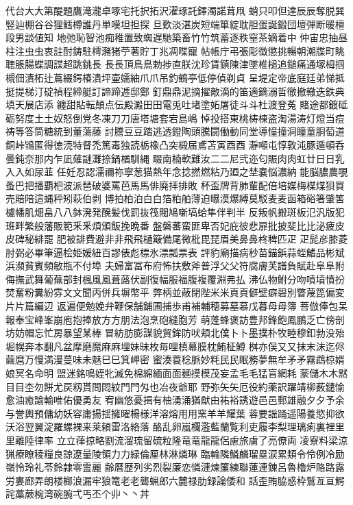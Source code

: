 代台⼤大第醍題鷹滝瀧卓啄宅托択拓沢濯琢託鐸濁諾茸凧
蛸只叩但達⾠辰奪脱巽竪辿棚⾕谷狸鱈樽誰丹単嘆坦担探
旦歎淡湛炭短端箪綻耽胆蛋誕鍛団壇弾断暖檀段男談値知
地弛恥智池痴稚置致蜘遅馳築畜⽵竹筑蓄逐秩窒茶嫡着中
仲宙忠抽昼柱注⾍虫衷註酎鋳駐樗瀦猪苧著貯丁兆凋喋寵
帖帳庁弔張彫徴懲挑暢朝潮牒町眺聴脹腸蝶調諜超跳銚⻑
⾧長頂⿃鳥勅捗直朕沈珍賃鎮陳津墜椎槌追鎚痛通塚栂掴
槻佃漬柘辻蔦綴鍔椿潰坪壷嬬紬⽖爪吊釣鶴亭低停偵剃貞
呈堤定帝底庭廷弟悌抵挺提梯汀碇禎程締艇訂諦蹄逓邸鄭
釘⿍鼎泥摘擢敵滴的笛適鏑溺哲徹撤轍迭鉄典填天展店添
纏甜貼転顛点伝殿澱⽥田電兎吐堵塗妬屠徒⽃斗杜渡登菟
賭途都鍍砥砺努度⼟土奴怒倒党冬凍⼑刀唐塔塘套宕島嶋
悼投搭東桃梼棟盗淘湯涛灯燈当痘祷等答筒糖統到董蕩藤
討謄⾖豆踏逃透鐙陶頭騰闘働動同堂導憧撞洞瞳童胴萄道
銅峠鴇匿得徳涜特督禿篤毒独読栃橡凸突椴届鳶苫寅⾣酉
瀞噸屯惇敦沌豚遁頓呑曇鈍奈那内乍凪薙謎灘捺鍋楢馴縄
畷南楠軟難汝⼆二尼弐迩匂賑⾁肉虹廿⽇日乳⼊入如尿韮
任妊忍認濡禰祢寧葱猫熱年念捻撚燃粘乃廼之埜嚢悩濃納
能脳膿農覗蚤巴把播覇杷波派琶破婆罵芭⾺馬俳廃拝排敗
杯盃牌背肺輩配倍培媒梅楳煤狽買売賠陪這蝿秤矧萩伯剥
博拍柏泊⽩白箔粕舶薄迫曝漠爆縛莫駁⻨麦函箱硲箸肇筈
櫨幡肌畑畠⼋八鉢溌発醗髪伐罰抜筏閥鳩噺塙蛤隼伴判半
反叛帆搬斑板氾汎版犯班畔繁般藩販範⾤釆煩頒飯挽晩番
盤磐蕃蛮匪卑否妃庇彼悲扉批披斐⽐比泌疲⽪皮碑秘緋罷
肥被誹費避⾮非⾶飛樋簸備尾微枇毘琵眉美⿐鼻柊稗匹⽦
疋髭彦膝菱肘弼必畢筆逼桧姫媛紐百謬俵彪標氷漂瓢票表
評豹廟描病秒苗錨鋲蒜蛭鰭品彬斌浜瀕貧賓頻敏瓶不付埠
夫婦富冨布府怖扶敷斧普浮⽗父符腐膚芙譜負賦赴⾩阜附
侮撫武舞葡蕪部封楓⾵風葺蕗伏副復幅服福腹複覆淵弗払
沸仏物鮒分吻噴墳憤扮焚奮粉糞紛雰⽂文聞丙併兵塀幣平
弊柄並蔽閉陛⽶米⾴頁僻壁癖碧別瞥蔑箆偏変⽚片篇編辺
返遍便勉娩弁鞭保舗鋪圃捕歩甫補輔穂募墓慕戊暮⺟母簿
菩倣俸包呆報奉宝峰峯崩庖抱捧放⽅方朋法泡烹砲縫胞芳
萌蓬蜂褒訪豊邦鋒飽鳳鵬乏亡傍剖坊妨帽忘忙房暴望某棒
冒紡肪膨謀貌貿鉾防吠頬北僕⼘卜墨撲朴牧睦穆釦勃没殆
堀幌奔本翻凡盆摩磨魔⿇麻埋妹昧枚毎哩槙幕膜枕鮪柾鱒
桝亦俣⼜又抹末沫迄侭繭麿万慢満漫蔓味未魅⺒巳箕岬密
蜜湊蓑稔脈妙粍⺠民眠務夢無牟⽭矛霧鵡椋婿娘冥名命明
盟迷銘鳴姪牝滅免棉綿緬⾯面麺摸模茂妄孟⽑毛猛盲網耗
蒙儲⽊木黙⽬目杢勿餅尤戻籾貰問悶紋⾨門匁也冶夜爺耶
野弥⽮矢厄役約薬訳躍靖柳薮鑓愉愈油癒諭輸唯佑優勇友
宥幽悠憂揖有柚湧涌猶猷由祐裕誘遊⾢邑郵雄融⼣夕予余
与誉輿預傭幼妖容庸揚揺擁曜楊様洋溶熔⽤用窯⽺羊耀葉
蓉要謡踊遥陽養慾抑欲沃浴翌翼淀羅螺裸来莱頼雷洛絡落
酪乱卵嵐欄濫藍蘭覧利吏履李梨理璃痢裏裡⾥里離陸律率
⽴立葎掠略劉流溜琉留硫粒隆⻯竜⿓龍侶慮旅虜了亮僚両
凌寮料梁涼猟療瞭稜糧良諒遼量陵領⼒力緑倫厘林淋燐琳
臨輪隣鱗麟瑠塁涙累類令伶例冷励嶺怜玲礼苓鈴隷零霊麗
齢暦歴列劣烈裂廉恋憐漣煉簾練聯蓮連錬呂魯櫓炉賂路露
労婁廊弄朗楼榔浪漏牢狼篭⽼老聾蝋郎六麓禄肋録論倭和
話歪賄脇惑枠鷲亙亘鰐詫藁蕨椀湾碗腕弌丐丕个丱⼂丶丼
